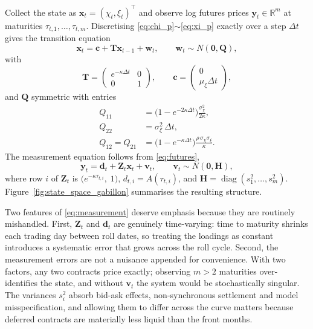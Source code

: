 \documentclass[journal]{IEEEtran}
\newcommand{\rng}{\ensuremath{\sim}}
\begin{document}
Collect the state as $\bm{x}_t = (\chi_t, \xi_t)^{\!\top}$ and observe log futures prices $\bm{y}_t \in \mathbb{R}^{m}$ at maturities $\tau_{t,1},\dots,\tau_{t,m}$. Discretising \eqref{eq:chi_p}\rng{}\eqref{eq:xi_p} exactly over a step $\Delta t$ gives the transition equation
%
\begin{equation}
  \bm{x}_t = \bm{c} + \bm{T}\bm{x}_{t-1} + \bm{w}_t ,
  \qquad \bm{w}_t \sim N(\bm{0}, \bm{Q}) ,
  \label{eq:transition}
\end{equation}
%
with
%
\begin{equation}
  \bm{T} = \begin{pmatrix} e^{-\kappa\Delta t} & 0 \\ 0 & 1 \end{pmatrix} ,
  \qquad
  \bm{c} = \begin{pmatrix} 0 \\ \mu_\xi \Delta t \end{pmatrix} ,
\end{equation}
%
and $\bm{Q}$ symmetric with entries
%
\begin{equation}
  \begin{aligned}
    Q_{11} &= \bigl(1 - e^{-2\kappa\Delta t}\bigr)
              \frac{\sigma_\chi^{2}}{2\kappa} , \\[2pt]
    Q_{22} &= \sigma_\xi^{2}\,\Delta t , \\[2pt]
    Q_{12} = Q_{21} &= \bigl(1 - e^{-\kappa\Delta t}\bigr)
              \frac{\rho\,\sigma_\chi\sigma_\xi}{\kappa} .
  \end{aligned}
\end{equation}
%
The measurement equation follows from \eqref{eq:futures},
%
\begin{equation}
  \bm{y}_t = \bm{d}_t + \bm{Z}_t\bm{x}_t + \bm{v}_t ,
  \qquad \bm{v}_t \sim N(\bm{0}, \bm{H}) ,
  \label{eq:measurement}
\end{equation}
%
where row $i$ of $\bm{Z}_t$ is $\bigl(e^{-\kappa\tau_{t,i}},\; 1\bigr)$, $d_{t,i} = A(\tau_{t,i})$, and $\bm{H} = \operatorname{diag}(s_1^{2},\dots,s_m^{2})$. Figure~\ref{fig:state_space_gabillon} summarises the resulting structure.

Two features of \eqref{eq:measurement} deserve emphasis because they are routinely mishandled. First, $\bm{Z}_t$ and $\bm{d}_t$ are genuinely time-varying: time to maturity shrinks each trading day between roll dates, so treating the loadings as constant introduces a systematic error that grows across the roll cycle. Second, the measurement errors are not a nuisance appended for convenience. With two factors, any two contracts price exactly; observing $m > 2$ maturities over-identifies the state, and without $\bm{v}_t$ the system would be stochastically singular. The variances $s_i^2$ absorb bid-ask effects, non-synchronous settlement and model misspecification, and allowing them to differ across the curve matters because deferred contracts are materially less liquid than the front months.
\end{document}
